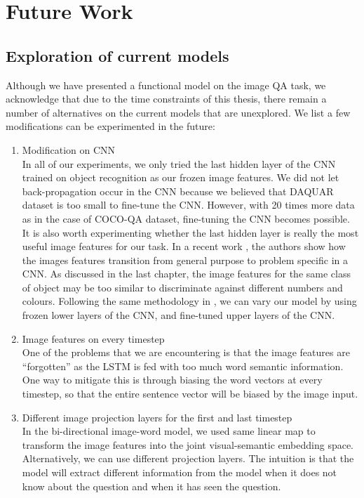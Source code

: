 \chapter{Future Work}
\label{future}

\section{Exploration of current models}
Although we have presented a functional model on the image QA task, we acknowledge that due to the time constraints of this thesis, there remain a number of alternatives on the current models that are unexplored. We list a few modifications can be experimented in the future:

\begin{enumerate}
\item Modification on CNN\\
In all of our experiments, we only tried the last hidden layer of the CNN trained on object recognition as our frozen image features. We did not let back-propagation occur in the CNN because we believed that DAQUAR dataset is too small to fine-tune the CNN. However, with 20 times more data as in the case of COCO-QA dataset, fine-tuning the CNN becomes possible. It is also worth experimenting whether the last hidden layer is really the most useful image features for our task. In a recent work \cite{yosinski14}, the authors show how the images features transition from general purpose to problem specific in a CNN. As discussed in the last chapter, the image features for the same class of object may be too similar to discriminate against different numbers and colours. Following the same methodology in \cite{yosinski14}, we can vary our model by using frozen lower layers of the CNN, and fine-tuned upper layers of the CNN.

\item Image features on every timestep\\
One of the problems that we are encountering is that the image features are ``forgotten'' as the LSTM is fed with too much word semantic information. One way to mitigate this is through biasing the word vectors at every timestep, so that the entire sentence vector will be biased by the image input.

\item Different image projection layers for the first and last timestep\\
In the bi-directional image-word model, we used same linear map to transform the image features into the joint visual-semantic embedding space. Alternatively, we can use different projection layers. The intuition is that the model will extract different information from the model when it does not know about the question and when it has seen the question.  

\end{enumerate}

